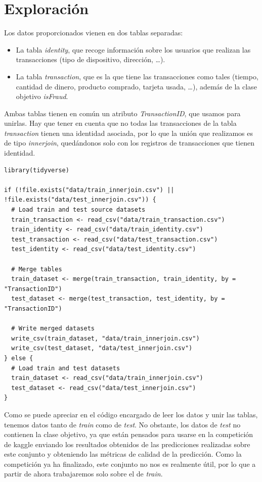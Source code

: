 \section{Exploración}
Los datos proporcionados vienen en dos tablas separadas:

\begin{itemize}
    \item La tabla \textit{identity}, que recoge información sobre
    los usuarios que realizan las transacciones (tipo de dispositivo,
    dirección, \dots).
    \item La tabla \textit{transaction}, que es la que tiene las
    transacciones como tales (tiempo, cantidad de dinero, producto
    comprado, tarjeta usada, \dots), además de la clase objetivo
    \textit{isFraud}.
\end{itemize}

Ambas tablas tienen en común un atributo \textit{TransactionID}, que usamos para
unirlas. Hay que tener en cuenta que no todas las transacciones de la tabla
\textit{transaction} tienen una identidad asociada, por lo que la unión que
realizamos es de tipo \textit{innerjoin}, quedándonos solo con los registros de
transacciones que tienen identidad.

\begin{lstlisting}
library(tidyverse)

if (!file.exists("data/train_innerjoin.csv") || !file.exists("data/test_innerjoin.csv")) {
  # Load train and test source datasets
  train_transaction <- read_csv("data/train_transaction.csv")
  train_identity <- read_csv("data/train_identity.csv")
  test_transaction <- read_csv("data/test_transaction.csv")
  test_identity <- read_csv("data/test_identity.csv")
  
  # Merge tables
  train_dataset <- merge(train_transaction, train_identity, by = "TransactionID")
  test_dataset <- merge(test_transaction, test_identity, by = "TransactionID")
  
  # Write merged datasets
  write_csv(train_dataset, "data/train_innerjoin.csv")
  write_csv(test_dataset, "data/test_innerjoin.csv")
} else {
  # Load train and test datasets
  train_dataset <- read_csv("data/train_innerjoin.csv")
  test_dataset <- read_csv("data/test_innerjoin.csv")
}
\end{lstlisting}

Como se puede apreciar en el código encargado de leer los datos y unir las
tablas, tenemos datos tanto de \textit{train} como de \textit{test}. No
obstante, los datos de \textit{test} no contienen la clase objetivo, ya que
están pensados para usarse en la competición de kaggle enviando los resultados
obtenidos de las predicciones realizadas sobre este conjunto y obteniendo las
métricas de calidad de la predicción. Como la competición ya ha finalizado, este
conjunto no nos es realmente útil, por lo que a partir de ahora trabajaremos
solo sobre el de \textit{train}.

